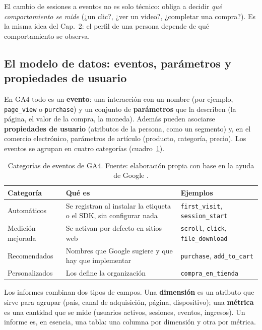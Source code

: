 El cambio de sesiones a eventos no es solo técnico: obliga a decidir
\emph{qué comportamiento se mide} (¿un clic?, ¿ver un video?, ¿completar una
compra?). Es la misma idea del Cap.~2: el perfil de una persona depende de
qué comportamiento se observa.

\subsection{El modelo de datos: eventos, parámetros y propiedades de usuario}

En GA4 todo es un \textbf{evento}: una interacción con un nombre (por
ejemplo, \texttt{page\_view} o \texttt{purchase}) y un conjunto de
\textbf{parámetros} que la describen (la página, el valor de la compra, la
moneda). Además pueden asociarse \textbf{propiedades de usuario} (atributos de
la persona, como un segmento) y, en el comercio electrónico, parámetros de
artículo (producto, categoría, precio). Los eventos se agrupan en cuatro
categorías (cuadro~\ref{tab:cap05-eventos}).

\begin{table}[!htb]
\centering
\begin{tabular}{@{}p{3.1cm}p{5.0cm}p{4.3cm}@{}}
\toprule
Categoría & Qué es & Ejemplos \\
\midrule
Automáticos & Se registran al instalar la etiqueta o el SDK, sin configurar nada & \texttt{first\_visit}, \texttt{session\_start} \\
Medición mejorada & Se activan por defecto en sitios web & \texttt{scroll}, \texttt{click}, \texttt{file\_download} \\
Recomendados & Nombres que Google sugiere y que hay que implementar & \texttt{purchase}, \texttt{add\_to\_cart} \\
Personalizados & Los define la organización & \texttt{compra\_en\_tienda} \\
\bottomrule
\end{tabular}
\caption{Categorías de eventos de GA4. Fuente: elaboración propia con base en
la ayuda de Google \parencite{google2026ga4eventos}.}
\label{tab:cap05-eventos}
\end{table}

Los informes combinan dos tipos de campos. Una \textbf{dimensión} es un
atributo que sirve para agrupar (país, canal de adquisición, página,
dispositivo); una \textbf{métrica} es una cantidad que se mide (usuarios
activos, sesiones, eventos, ingresos). Un informe es, en esencia, una tabla:
una columna por dimensión y otra por métrica.

